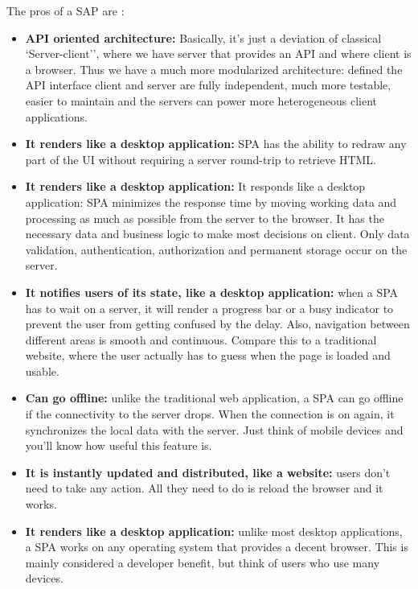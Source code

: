 \documentclass[a4paper,13pt]{report}
\begin{document}
The pros of a SAP are :
\begin{itemize}
    \item
        \textbf{API oriented architecture: } Basically, it's just a deviation of classical `Server-client'', where we have server that provides an API and where client is a browser. Thus we have a much more modularized architecture: defined the API interface client and server are fully independent, much more testable, easier to maintain and the servers can power more heterogeneous client applications.

    \item
    \textbf{It renders like a desktop application: } SPA has the ability to redraw any part of the UI without requiring a server round-trip to retrieve HTML.

    \item
    \textbf{It renders like a desktop application: }
    It responds like a desktop application: SPA minimizes the response time by moving working data and processing as much as possible from the server to the browser. It has the necessary data and business logic to make most decisions on client. Only data validation, authentication, authorization and permanent storage occur on the server.
    \item
    \textbf{It notifies users of its state, like a desktop application:  }
    when a SPA has to wait on a server, it will render a progress bar or a busy indicator to prevent the user from getting confused by the delay. Also, navigation between different areas is smooth and continuous. Compare this to a traditional website, where the user actually has to guess when the page is loaded and usable.
    \item
    \textbf{Can go offline: }
     unlike the traditional web application, a SPA can go offline if the connectivity to the server drops. When the connection is on again, it synchronizes the local data with the server. Just think of mobile devices and you'll know how useful this feature is.
    \item
    \textbf{It is instantly updated and distributed, like a website: }
     users don't need to take any action. All they need to do is reload the browser and it works.
    \item
    \textbf{It renders like a desktop application: }
     unlike most desktop applications, a SPA works on any operating system that provides a decent browser. This is mainly considered a developer benefit, but think of users who use many devices.
\end{itemize}
\end{document}
